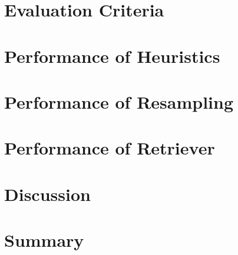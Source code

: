 \label{sec:evaluation:introduction}



\section{Evaluation Criteria}
\label{sec:evaluation:rqs}



\section{Performance of Heuristics}
\label{sec:evaluation:heuristics}



\section{Performance of Resampling}
\label{sec:evaluation:resampler}



\section{Performance of Retriever}
\label{sec:evaluation:retrieval}



\section{Discussion}
\label{sec:evaluation:discussion}



\section{Summary}
\label{sec:evaluation:summary}



